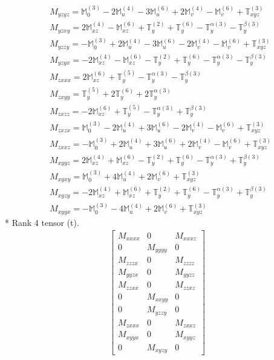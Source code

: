 \documentclass[fleqn,8pt,landscape]{jsarticle}
\begin{document}
\begin{align*}
& M_{yzyz} = \mathbb{M}_{0}^{(3)} - 2 \mathbb{M}_{u}^{(4)} - 3 \mathbb{M}_{u}^{(6)} + 2 \mathbb{M}_{v}^{(4)} - \mathbb{M}_{v}^{(6)} + \mathbb{T}_{xyz}^{(3)} \\
& M_{yzxy} = 2 \mathbb{M}_{xz}^{(4)} - \mathbb{M}_{xz}^{(6)} + \mathbb{T}_{y}^{(2)} + \mathbb{T}_{y}^{(6)} - \mathbb{T}_{y}^{\alpha(3)} - \mathbb{T}_{y}^{\beta(3)} \\
& M_{yzzy} = - \mathbb{M}_{0}^{(3)} + 2 \mathbb{M}_{u}^{(4)} - 3 \mathbb{M}_{u}^{(6)} - 2 \mathbb{M}_{v}^{(4)} - \mathbb{M}_{v}^{(6)} + \mathbb{T}_{xyz}^{(3)} \\
& M_{yzyx} = - 2 \mathbb{M}_{xz}^{(4)} - \mathbb{M}_{xz}^{(6)} - \mathbb{T}_{y}^{(2)} + \mathbb{T}_{y}^{(6)} - \mathbb{T}_{y}^{\alpha(3)} - \mathbb{T}_{y}^{\beta(3)} \\
& M_{zxxx} = 2 \mathbb{M}_{xz}^{(6)} + \mathbb{T}_{y}^{(5)} - \mathbb{T}_{y}^{\alpha(3)} - \mathbb{T}_{y}^{\beta(3)} \\
& M_{zxyy} = \mathbb{T}_{y}^{(5)} + 2 \mathbb{T}_{y}^{(6)} + 2 \mathbb{T}_{y}^{\alpha(3)} \\
& M_{zxzz} = - 2 \mathbb{M}_{xz}^{(6)} + \mathbb{T}_{y}^{(5)} - \mathbb{T}_{y}^{\alpha(3)} + \mathbb{T}_{y}^{\beta(3)} \\
& M_{zxzx} = \mathbb{M}_{0}^{(3)} - 2 \mathbb{M}_{u}^{(4)} + 3 \mathbb{M}_{u}^{(6)} - 2 \mathbb{M}_{v}^{(4)} - \mathbb{M}_{v}^{(6)} + \mathbb{T}_{xyz}^{(3)} \\
& M_{zxxz} = - \mathbb{M}_{0}^{(3)} + 2 \mathbb{M}_{u}^{(4)} + 3 \mathbb{M}_{u}^{(6)} + 2 \mathbb{M}_{v}^{(4)} - \mathbb{M}_{v}^{(6)} + \mathbb{T}_{xyz}^{(3)} \\
& M_{xyyz} = 2 \mathbb{M}_{xz}^{(4)} + \mathbb{M}_{xz}^{(6)} - \mathbb{T}_{y}^{(2)} + \mathbb{T}_{y}^{(6)} - \mathbb{T}_{y}^{\alpha(3)} + \mathbb{T}_{y}^{\beta(3)} \\
& M_{xyxy} = \mathbb{M}_{0}^{(3)} + 4 \mathbb{M}_{u}^{(4)} + 2 \mathbb{M}_{v}^{(6)} + \mathbb{T}_{xyz}^{(3)} \\
& M_{xyzy} = - 2 \mathbb{M}_{xz}^{(4)} + \mathbb{M}_{xz}^{(6)} + \mathbb{T}_{y}^{(2)} + \mathbb{T}_{y}^{(6)} - \mathbb{T}_{y}^{\alpha(3)} + \mathbb{T}_{y}^{\beta(3)} \\
& M_{xyyx} = - \mathbb{M}_{0}^{(3)} - 4 \mathbb{M}_{u}^{(4)} + 2 \mathbb{M}_{v}^{(6)} + \mathbb{T}_{xyz}^{(3)}
\end{align*}
* Rank 4 tensor (t).
\begin{align*}
\begin{bmatrix} M_{xxxx} & 0 & M_{xxxz} \\ 0 & M_{yyyy} & 0 \\ M_{zzzx} & 0 & M_{zzzz} \\ M_{yyzx} & 0 & M_{yyzz} \\ M_{zzxx} & 0 & M_{zzxz} \\ 0 & M_{xxyy} & 0 \\ 0 & M_{yzzy} & 0 \\ M_{zxxx} & 0 & M_{zxxz} \\ M_{xyyx} & 0 & M_{xyyz} \\ 0 & M_{xyzy} & 0 \end{bmatrix}
\end{align*}
\end{document}
